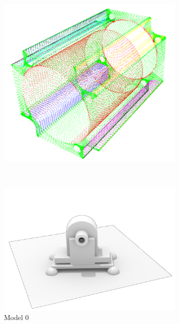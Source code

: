 \begin{figure}
\begin{subfigure}[b]{0.3\linewidth}
		\includegraphics[width=\textwidth]{figures/m3_pc.png}
	\end{subfigure}	 
	\\
	\begin{subfigure}[b]{0.30\linewidth}
		\centering
		\includegraphics[width=\textwidth]{figures/m0_rendering_wo.png}
		\caption{Model $0$}
	\end{subfigure}	 
	\begin{subfigure}[b]{0.3\linewidth}
		\centering

\end{subfigure}
\end{figure}
